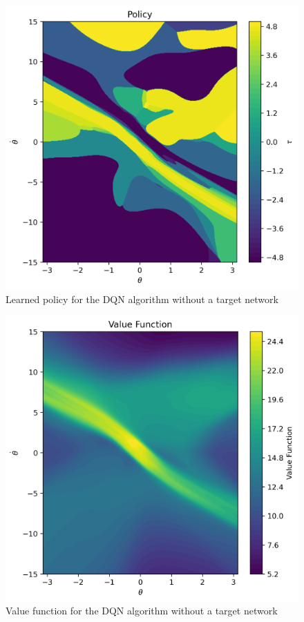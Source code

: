 \documentclass[conference]{IEEEtran}
\begin{document}
\begin{figure}[h]
\centering
\includegraphics[width=\linewidth]{../figures/no_target_yes_replay/ctr_policy_150_1.png}
\caption{Learned policy for the DQN algorithm without a target network}
\label{fig:no_target_yes_replay_policy}
\end{figure}
\begin{figure}[h]
\centering
\includegraphics[width=\linewidth]{../figures/no_target_yes_replay/ctr_value_func_150_1.png}
\caption{Value function for the DQN algorithm without a target network}
\label{fig:no_target_yes_replay_value_function}
\end{figure}
\end{document}
